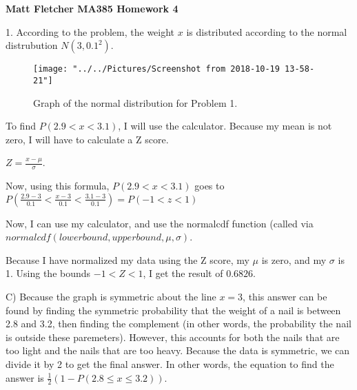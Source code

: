 \documentclass{article}
\begin{document}
	

\thispagestyle{empty}

\let\oldemptyset\emptyset
\let\emptyset\varnothing


\newcommand*{\Perm}[2]{{}^{#1}\!P_{#2}}
\newcommand*{\Comb}[2]{{}^{#1}C_{#2}}


	
\textbf{	Matt Fletcher MA385 Homework 4}
\smallskip

1. According to the problem, the weight $x$ is distributed according to the normal distrubution $N(3, 0.1^2)$. 

\begin{figure}[h]
	\centering
	\texttt{[image: "../../Pictures/Screenshot from 2018-10-19 13-58-21"]}
	\caption{Graph of the normal distribution for Problem 1. }
	\label{fig:screenshot-from-2018-10-19-13-58-21}
\end{figure}


To find $P(2.9 < x < 3.1)$, I will use the calculator. Because my mean is not zero, I will have to calculate a Z score. 

$Z = \frac{x-\mu}{\sigma}$.

Now, using this formula, $P(2.9 < x < 3.1)$ goes to $P(\frac{2.9-3}{0.1} < \frac{x-3}{0.1} < \frac{3.1-3}{0.1})=P(-1 < z < 1)$

Now, I can use my calculator, and use the normalcdf function (called via $normalcdf(lowerbound,upperbound,\mu,\sigma)$. 

Because I have normalized my data using the Z score, my $\mu$ is zero, and my $\sigma$ is 1. Using the bounds $-1<Z<1$, I get the result of $\boxed{0.6826}. $

C) Because the graph is symmetric about the line $x=3$, this answer can be found by finding the symmetric probability that the weight of a nail is between 2.8 and 3.2, then finding the complement (in other words, the probability the nail is outside these paremeters). However, this accounts for both the nails that are too light and the nails that are too heavy. Because the data is symmetric, we can divide it by 2 to get the final answer. In other words, the equation to find the answer is $\frac{1}{2}(1 - P(2.8 \leq x \leq 3.2) )$. 
\end{document}
